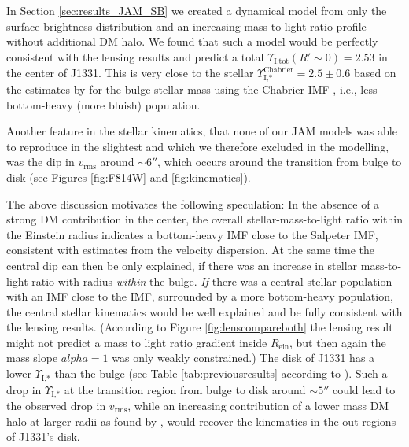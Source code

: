In Section \ref{sec:results_JAM_SB} we created a dynamical model from only the surface brightness distribution and an increasing mass-to-light ratio profile without additional DM halo. We found that such a model would be perfectly consistent with the lensing results and predict a total $\Upsilon_\text{I,tot}(R'\sim0) = 2.53$ in the center of J1331. This is very close to the stellar $\Upsilon_\text{I,*}^\text{Chabrier} = 2.5 \pm 0.6$ based on the estimates by \citet{SWELLSI} for the bulge stellar mass using the Chabrier IMF , i.e., less bottom-heavy (more bluish) population.

Another feature in the stellar kinematics, that none of our JAM models was able to reproduce in the slightest and which we therefore excluded in the modelling, was the dip in $v_\text{rms}$ around $\sim 6''$, which occurs around the transition from bulge to disk (see Figures \ref{fig:F814W} and \ref{fig:kinematics}).



The above discussion motivates the following speculation: In the absence of a strong DM contribution in the center, the overall stellar-mass-to-light ratio within the Einstein radius indicates a bottom-heavy IMF close to the Salpeter IMF, consistent with estimates from the velocity dispersion. At the same time the central dip can then be only explained, if there was an increase in stellar mass-to-light ratio with radius \textit{within} the bulge. \emph{If} there was a central stellar population with an IMF close to the \citet{Chabrier2003} IMF, surrounded by a more bottom-heavy population, the central stellar kinematics would be well explained and be fully consistent with the lensing results. (According to Figure \ref{fig:lenscompareboth} the lensing result might not predict a mass to light ratio gradient inside $R_\text{ein}$, but then again the mass slope $alpha=1$ was only weakly constrained.) The disk of J1331 has a lower $\Upsilon_\text{I,*}$ than the bulge (see Table \ref{tab:previousresults} according to \citet{SWELLSI}). Such a drop in $\Upsilon_\text{I,*}$ at the transition region from bulge to disk around $\sim 5''$ could lead to the observed drop in $v_\text{rms}$, while an increasing contribution of a lower mass DM halo at larger radii as found by \citet{SWELLSV}, would recover the kinematics in the out regions of J1331's disk.


